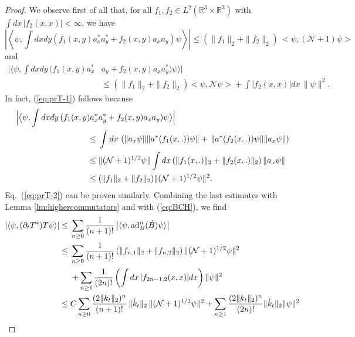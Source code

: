 \documentclass[11pt,a4paper]{article}
\newcommand{\bR}{{\mathbb R}}
\newcommand{\cN}{{\cal N}}
\newcommand{\di}{{d}}		%
\newcommand{\Ncal}{\mathcal{N}}		%
\newcommand{\scal}[2]{\big<#1,#2\big>} %
\begin{document}
\begin{proof}
We observe first of all that, for all $f_1, f_2 \in L^2 (\bR^3 \times\bR^3)$ with $\int dx \, |f_2 (x,x)| < \infty$,
we have
\begin{equation}\label{eq:prT-1}  \left| \left\langle \psi, \int dx dy \left( f_1(x,y) a^\ast_x a^\ast_y + f_2(x,y) a_x a_y \right) \psi \right\rangle \right|  \leq (\| f_1 \|_2 + \| f_2 \|_2) \, \scal{\psi}{(\Ncal+1)\psi} 
\end{equation}
and
\begin{equation}\label{eq:prT-2} \begin{split} \Big|  \big\langle \psi , \int dx dy \, ( f_1(x,y) a^\ast_x
& a_y + f_2(x,y) a_x a^\ast_y ) \psi \big\rangle \Big|  \\ & \leq (\| f_1 \|_2 + \| f_2 \|_2) \scal{\psi}{\Ncal\psi} + \int |f_2(x,x)| \di x  \, \| \psi \|^2 .
\end{split} \end{equation}
In fact, (\ref{eq:prT-1}) follows because
\[ \begin{split} 
 \Big| \big\langle \psi, \int dx dy \, ( f_1(x,y) a^\ast_x &a^\ast_y + f_2(x,y) a_x a_y) \psi \big\rangle \Big| \\
 \leq \; & \int dx \, \left( \| a_x \psi \| \| a^* (f_1(x,.)) \psi \| +  \, \| a^* (f_2 (x,.)) \psi \| \| a_x \psi \| \right) \\
 \leq \; & \| (\cN +1)^{1/2} \psi \|  \int dx \, (\| f_1(x,.) \|_2 + \| f_2 (x,.)\|_2) \,  \| a_x \psi \| \\
 \leq \; & (\| f_1 \|_2 + \| f_2 \|_2) \| (\cN+1)^{1/2} \psi \|^2.
 \end{split} \]
 Eq.\ (\ref{eq:prT-2}) can be proven similarly. Combining the last estimates with Lemma \ref{lm:highercommutators} and with (\ref{eq:BCH}), we find
 \[ \begin{split} 
| \langle \psi , (\partial_t T^*)T \psi \rangle|  \leq \; &\sum_{n \geq 0} \frac{1}{(n+1)!} \left| \langle \psi , \text{ad}^n_B (\dot{B}) \psi \rangle \right| \\
\leq \; &\sum_{n \geq 0} \frac{1}{(n+1)!} \left( \| f_{n,1} \|_2 + \| f_{n,2} \|_2 \right)  \| (\cN+1)^{1/2} \psi \|^2 \\& + \sum_{n\geq 1} \frac{1}{(2n)!}  \left(\int dx \, |f_{2n-1,2} (x,x)| dx \right)  \| \psi \|^2 \\
\leq \; &C \sum_{n\geq 0} \frac{(2 \| k_t \|_2)^n}{(n+1)!} \, \| \dot{k}_t \|_2 \, \| (\cN+1)^{1/2} \psi \|^2 + %
\sum_{n\geq 1} \frac{(2\| k_t \|_2)^n}{(2n)!}  \| \dot k_t \|_2 \| \psi \|^2 \\ 

\end{split}\]
\end{proof}
\end{document}

